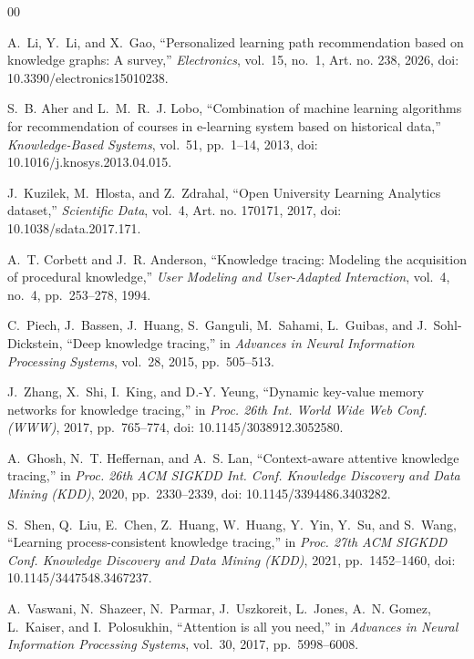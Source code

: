 \begin{thebibliography}{00}

A.~Li, Y.~Li, and X.~Gao, ``Personalized learning path recommendation based on knowledge
graphs: A survey,'' \emph{Electronics}, vol.~15, no.~1, Art. no. 238, 2026, doi:
10.3390/electronics15010238.

S.~B. Aher and L.~M.~R.~J. Lobo, ``Combination of machine learning algorithms for
recommendation of courses in e-learning system based on historical data,''
\emph{Knowledge-Based Systems}, vol.~51, pp.~1--14, 2013, doi:
10.1016/j.knosys.2013.04.015.

J.~Kuzilek, M.~Hlosta, and Z.~Zdrahal, ``Open University Learning Analytics dataset,''
\emph{Scientific Data}, vol.~4, Art. no. 170171, 2017, doi: 10.1038/sdata.2017.171.

A.~T. Corbett and J.~R. Anderson, ``Knowledge tracing: Modeling the acquisition of
procedural knowledge,'' \emph{User Modeling and User-Adapted Interaction}, vol.~4, no.~4,
pp.~253--278, 1994.

C.~Piech, J.~Bassen, J.~Huang, S.~Ganguli, M.~Sahami, L.~Guibas, and J.~Sohl-Dickstein,
``Deep knowledge tracing,'' in \emph{Advances in Neural Information Processing Systems},
vol.~28, 2015, pp.~505--513.

J.~Zhang, X.~Shi, I.~King, and D.-Y. Yeung, ``Dynamic key-value memory networks for
knowledge tracing,'' in \emph{Proc. 26th Int. World Wide Web Conf. (WWW)}, 2017,
pp.~765--774, doi: 10.1145/3038912.3052580.

A.~Ghosh, N.~T. Heffernan, and A.~S. Lan, ``Context-aware attentive knowledge tracing,''
in \emph{Proc. 26th ACM SIGKDD Int. Conf. Knowledge Discovery and Data Mining (KDD)},
2020, pp.~2330--2339, doi: 10.1145/3394486.3403282.

S.~Shen, Q.~Liu, E.~Chen, Z.~Huang, W.~Huang, Y.~Yin, Y.~Su, and S.~Wang, ``Learning
process-consistent knowledge tracing,'' in \emph{Proc. 27th ACM SIGKDD Conf. Knowledge
Discovery and Data Mining (KDD)}, 2021, pp.~1452--1460, doi: 10.1145/3447548.3467237.

A.~Vaswani, N.~Shazeer, N.~Parmar, J.~Uszkoreit, L.~Jones, A.~N. Gomez, L.~Kaiser, and
I.~Polosukhin, ``Attention is all you need,'' in \emph{Advances in Neural Information
Processing Systems}, vol.~30, 2017, pp.~5998--6008.


\end{thebibliography}
